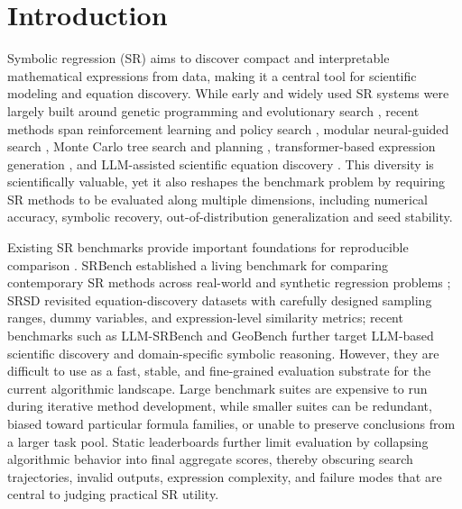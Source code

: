 \section{Introduction}

Symbolic regression (SR) aims to discover compact and interpretable mathematical expressions from data, making it a central tool for scientific modeling and equation discovery. While early and widely used SR systems were largely built around genetic programming and evolutionary search \citep{koza1992genetic,cranmer2023pysr}, recent methods span reinforcement learning and policy search \citep{petersen2021dsr}, modular neural-guided search \citep{landajuela2022unified}, Monte Carlo tree search and planning \citep{kamienny2023deep,shojaee2023tpsr}, transformer-based expression generation \citep{valipour2021symbolicgpt}, and LLM-assisted scientific equation discovery \citep{shojaee2025llmsr,grayeli2024lasr}. This diversity is scientifically valuable, yet it also reshapes the benchmark problem by requiring SR methods to be evaluated along multiple dimensions, including numerical accuracy, symbolic recovery, out-of-distribution generalization and seed stability.

Existing SR benchmarks provide important foundations for reproducible comparison \citep{lacava2021contemporary,matsubara2024rethinking,shojaee2025llmsrbench,xu2024geobench}. SRBench\citep{lacava2021contemporary} established a living benchmark for comparing contemporary SR methods across real-world and synthetic regression problems ; SRSD\citep{matsubara2024rethinking} revisited equation-discovery datasets with carefully designed sampling ranges, dummy variables, and expression-level similarity metrics; recent benchmarks such as LLM-SRBench\citep{shojaee2025llmsrbench} and GeoBench\citep{xu2024geobench} further target LLM-based scientific discovery and domain-specific symbolic reasoning. However, they are difficult to use as a fast, stable, and fine-grained evaluation substrate for the current algorithmic landscape. Large benchmark suites are expensive to run during iterative method development, while smaller suites can be redundant, biased toward particular formula families, or unable to preserve conclusions from a larger task pool. Static leaderboards further limit evaluation by collapsing algorithmic behavior into final aggregate scores, thereby obscuring search trajectories, invalid outputs, expression complexity, and failure modes that are central to judging practical SR utility.

